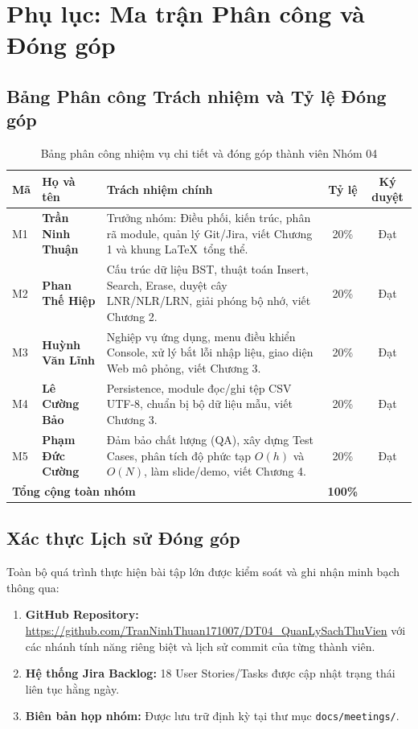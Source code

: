 \chapter*{Phụ lục: Ma trận Phân công và Đóng góp}

\section*{Bảng Phân công Trách nhiệm và Tỷ lệ Đóng góp}

\begin{table}[htbp]
\centering
\caption{Bảng phân công nhiệm vụ chi tiết và đóng góp thành viên Nhóm 04}
\label{tab:team_contributions}
\small
\begin{tabularx}{\textwidth}{l l X c c}
\toprule
\textbf{Mã} & \textbf{Họ và tên} & \textbf{Trách nhiệm chính} & \textbf{Tỷ lệ} & \textbf{Ký duyệt} \\
\midrule
M1 & \textbf{Trần Ninh Thuận} & Trưởng nhóm: Điều phối, kiến trúc, phân rã module, quản lý Git/Jira, viết Chương 1 và khung \LaTeX\ tổng thể. & 20\% & Đạt \\
M2 & \textbf{Phan Thế Hiệp} & Cấu trúc dữ liệu BST, thuật toán Insert, Search, Erase, duyệt cây LNR/NLR/LRN, giải phóng bộ nhớ, viết Chương 2. & 20\% & Đạt \\
M3 & \textbf{Huỳnh Văn Lĩnh} & Nghiệp vụ ứng dụng, menu điều khiển Console, xử lý bắt lỗi nhập liệu, giao diện Web mô phỏng, viết Chương 3. & 20\% & Đạt \\
M4 & \textbf{Lê Cường Bảo} & Persistence, module đọc/ghi tệp CSV UTF-8, chuẩn bị bộ dữ liệu mẫu, viết Chương 3. & 20\% & Đạt \\
M5 & \textbf{Phạm Đức Cường} & Đảm bảo chất lượng (QA), xây dựng Test Cases, phân tích độ phức tạp $O(h)$ và $O(N)$, làm slide/demo, viết Chương 4. & 20\% & Đạt \\
\midrule
\multicolumn{3}{l}{\textbf{Tổng cộng toàn nhóm}} & \textbf{100\%} & \\
\bottomrule
\end{tabularx}
\end{table}

\section*{Xác thực Lịch sử Đóng góp}
Toàn bộ quá trình thực hiện bài tập lớn được kiểm soát và ghi nhận minh bạch thông qua:
\begin{enumerate}
    \item \textbf{GitHub Repository:} \url{https://github.com/TranNinhThuan171007/DT04_QuanLySachThuVien} với các nhánh tính năng riêng biệt và lịch sử commit của từng thành viên.
    \item \textbf{Hệ thống Jira Backlog:} 18 User Stories/Tasks được cập nhật trạng thái liên tục hằng ngày.
    \item \textbf{Biên bản họp nhóm:} Được lưu trữ định kỳ tại thư mục \texttt{docs/meetings/}.
\end{enumerate}
